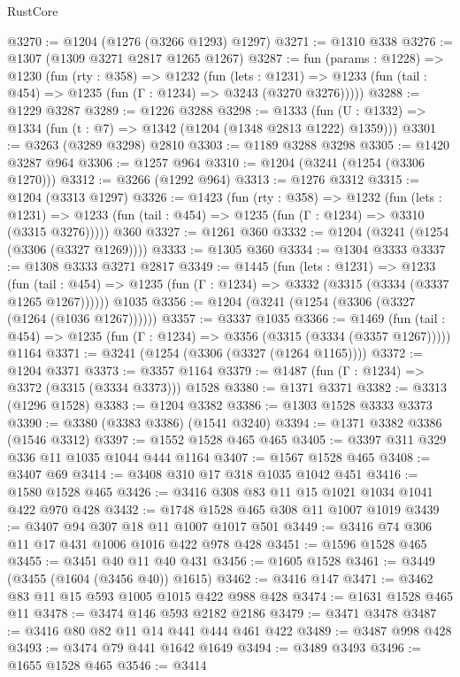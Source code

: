 \begin{lexlean}{RustCore}
\begin{coremodule}
@3270 := @1204 (@1276 (@3266 @1293) @1297)
@3271 := @1310 @338
@3276 := @1307 (@1309 @3271 @2817 @1265 @1267)
@3287 := fun (params : @1228) =>
  @1230
    (fun (rty : @358) =>
    @1232
      (fun (lets : @1231) =>
      @1233 (fun (tail : @454) => @1235 (fun (Γ : @1234) => @3243 (@3270 @3276)))))
@3288 := @1229 @3287
@3289 := @1226 @3288
@3298 := @1333 (fun (U : @1332) => @1334 (fun (t : @7) => @1342 (@1204 (@1348 @2813 @1222) @1359)))
@3301 := @3263 (@3289 @3298) @2810
@3303 := @1189 @3288 @3298
@3305 := @1420 @3287 @964
@3306 := @1257 @964
@3310 := @1204 (@3241 (@1254 (@3306 @1270)))
@3312 := @3266 (@1292 @964)
@3313 := @1276 @3312
@3315 := @1204 (@3313 @1297)
@3326 := @1423
    (fun (rty : @358) =>
    @1232
      (fun (lets : @1231) =>
      @1233 (fun (tail : @454) => @1235 (fun (Γ : @1234) => @3310 (@3315 @3276)))))
    @360
@3327 := @1261 @360
@3332 := @1204 (@3241 (@1254 (@3306 (@3327 @1269))))
@3333 := @1305 @360
@3334 := @1304 @3333
@3337 := @1308 @3333 @3271 @2817
@3349 := @1445
    (fun (lets : @1231) =>
    @1233
      (fun (tail : @454) => @1235 (fun (Γ : @1234) => @3332 (@3315 (@3334 (@3337 @1265 @1267))))))
    @1035
@3356 := @1204 (@3241 (@1254 (@3306 (@3327 (@1264 (@1036 @1267))))))
@3357 := @3337 @1035
@3366 := @1469
    (fun (tail : @454) => @1235 (fun (Γ : @1234) => @3356 (@3315 (@3334 (@3357 @1267)))))
    @1164
@3371 := @3241 (@1254 (@3306 (@3327 (@1264 @1165))))
@3372 := @1204 @3371
@3373 := @3357 @1164
@3379 := @1487 (fun (Γ : @1234) => @3372 (@3315 (@3334 @3373))) @1528
@3380 := @1371 @3371
@3382 := @3313 (@1296 @1528)
@3383 := @1204 @3382
@3386 := @1303 @1528 @3333 @3373
@3390 := @3380 (@3383 @3386) (@1541 @3240)
@3394 := @1371 @3382 @3386 (@1546 @3312)
@3397 := @1552 @1528 @465 @465
@3405 := @3397 @311 @329 @336 @11 @1035 @1044 @444 @1164
@3407 := @1567 @1528 @465
@3408 := @3407 @69
@3414 := @3408 @310 @17 @318 @1035 @1042 @451
@3416 := @1580 @1528 @465
@3426 := @3416 @308 @83 @11 @15 @1021 @1034 @1041 @422 @970 @428
@3432 := @1748 @1528 @465 @308 @11 @1007 @1019
@3439 := @3407 @94 @307 @18 @11 @1007 @1017 @501
@3449 := @3416 @74 @306 @11 @17 @431 @1006 @1016 @422 @978 @428
@3451 := @1596 @1528 @465
@3455 := @3451 @40 @11 @40 @431
@3456 := @1605 @1528
@3461 := @3449 (@3455 (@1604 (@3456 @40)) @1615)
@3462 := @3416 @147
@3471 := @3462 @83 @11 @15 @593 @1005 @1015 @422 @988 @428
@3474 := @1631 @1528 @465 @11
@3478 := @3474 @146 @593 @2182 @2186
@3479 := @3471 @3478
@3487 := @3416 @80 @82 @11 @14 @441 @444 @461 @422
@3489 := @3487 @998 @428
@3493 := @3474 @79 @441 @1642 @1649
@3494 := @3489 @3493
@3496 := @1655 @1528 @465
@3546 := @3414

\end{coremodule}
\end{lexlean}

